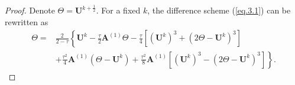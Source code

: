 \documentclass{siamart171218}
\numberwithin{theorem}{section}
\numberwithin{equation}{section}
\begin{document}
\begin{proof}
Denote $\Theta=\mathbf{U}^{k+\frac{1}{2}}$.
For a fixed $k$, the difference scheme (\ref{eq.3.1}) can be rewritten as
\begin{equation}\label{eq.3.6}
\begin{aligned}\displaystyle
\Theta=&\frac{2}{2-\tau}\left\{\mathbf{U}^{k}-\frac{\tau}{2}\mathbf{A}^{(1)}\Theta
-\frac{\tau}{4}\left[\left(\mathbf{U}^{k}\right)^3+\left(2\Theta-\mathbf{U}^{k}\right)^3\right]
\right.\\
&+\frac{\tau^2}{4}\mathbf{A}^{(1)}\left(\Theta-\mathbf{U}^{k}\right)+\left.
\frac{\tau^2}{8}\mathbf{A}^{(1)}
\left[\left(\mathbf{U}^{k}\right)^3-\left(2\Theta-\mathbf{U}^{k}\right)^3\right]
\right\}.
\end{aligned}
\end{equation}


\end{proof}
\end{document}
